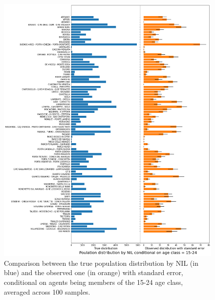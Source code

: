 \begin{figure}[H]
    \centering
    \includegraphics[scale = 0.45]{tex/pics/pop_by_nil_15.png}
    \caption{Comparison between the true population distribution by NIL (in blue) and the observed one (in orange) with standard error, conditional on agents being members of the 15-24 age class, averaged across 100 samples.}
    \label{pop_nil_15}
\end{figure}

